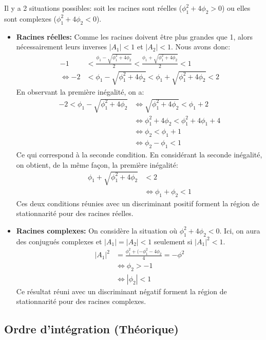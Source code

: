 \documentclass{article}
\begin{document}
Il y a 2 situations possibles: soit les racines sont réelles ($\phi_1^2+4\phi_2>0$) ou elles sont complexes ($\phi_1^2+4\phi_2<0$).
\begin{itemize}
\item \textbf{Racines réelles:}
  Comme les racines doivent être plus grandes que 1, alors nécessairement leurs inverses $|A_1|<1$ et $|A_2|<1$. Nous avons donc:
  \begin{align*}
    -1 &< \frac{\phi_1-\sqrt{\phi_1^2+4\phi_2}}{2} <  \frac{\phi_1+\sqrt{\phi_1^2+4\phi_2}}{2} < 1 \\
    \Leftrightarrow -2 &< \phi_1-\sqrt{\phi_1^2+4\phi_2} < \phi_1+\sqrt{\phi_1^2+4\phi_2} < 2
  \end{align*}
  En observant la première inégalité, on a:
  \begin{align*}
    -2 < \phi_1-\sqrt{\phi_1^2+4\phi_2}
    &\Leftrightarrow \sqrt{\phi_1^2+4\phi_2}<\phi_1+2 \\
    &\Leftrightarrow \phi_1^2+4\phi_2 < \phi_1^2+4\phi_1+4 \\
    &\Leftrightarrow \phi_2 < \phi_1 + 1 \\
    &\Leftrightarrow \phi_2 - \phi_1 < 1
  \end{align*}
  Ce qui correspond à la seconde condition. En considérant la seconde inégalité, on obtient, de la même façon, la première inégalité:
  \begin{align*}
    \phi_1+\sqrt{\phi_1^2+4\phi_2} &< 2 \\
    &\Leftrightarrow \phi_1 + \phi_2 < 1
  \end{align*}
  Ces deux conditions réunies avec un discriminant positif forment la région de stationnarité pour des racines réelles.
  
\item \textbf{Racines complexes:}  
  On considère la situation où $\phi_1^2+4\phi_2<0$. Ici, on aura des conjugués complexes et $|A_1| = |A_2| <1$ seulement si $|A_1|^2<1$.
  \begin{align*}
    |A_1|^2 &=\frac{\phi_1^2+(-\phi_1^2-4\phi_2}{4}=-\phi^2 \\
    &\Leftrightarrow \phi_2>-1 \\
    &\Leftrightarrow |\phi_2|<1
  \end{align*}
  Ce résultat réuni avec un discriminant négatif forment la région de stationnarité pour des racines complexes.
\end{itemize}

\clearpage
\subsection{Ordre d'intégration (Théorique)}
\end{document}
